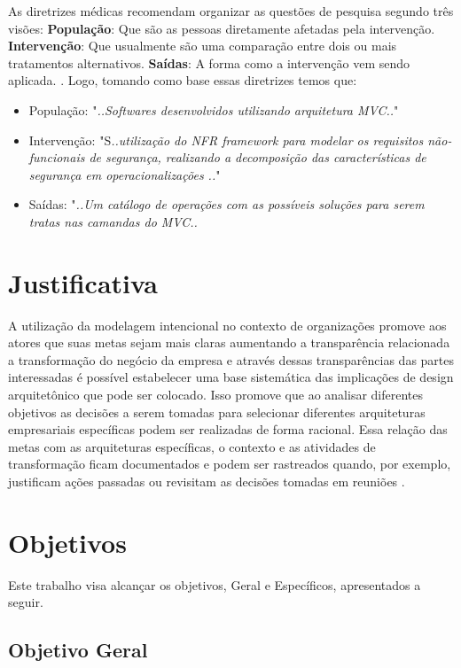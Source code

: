 As diretrizes médicas recomendam organizar as questões de pesquisa segundo três visões: \textbf{População}: Que são as pessoas diretamente afetadas pela intervenção. \textbf{Intervenção}: Que usualmente são uma comparação entre dois ou mais tratamentos alternativos. \textbf{Saídas}: A forma como a intervenção vem sendo aplicada. \cite{keele2007guidelines}. Logo, tomando como base essas diretrizes temos que: 

\begin{itemize}
	\item População: "\textit{..Softwares desenvolvidos utilizando arquitetura MVC..}"
	\item Intervenção: "S\textit{..utilização do NFR framework para modelar os requisitos não-funcionais de segurança, realizando a decomposição das características de segurança em operacionalizações  ..}"
	\item Saídas: "\textit{..Um catálogo de operações com as possíveis soluções para serem tratas nas camandas do MVC..}
\end{itemize}
\section{Justificativa}

A utilização da modelagem intencional no contexto de organizações promove aos atores que suas metas sejam mais claras aumentando a transparência relacionada a transformação do negócio da empresa e através dessas transparências das partes interessadas é possível estabelecer uma base sistemática das implicações de design arquitetônico que pode ser colocado. Isso promove que ao analisar diferentes objetivos as decisões a serem tomadas para selecionar diferentes arquiteturas empresariais específicas podem ser realizadas de forma racional. Essa relação das metas com as arquiteturas específicas, o contexto e as atividades de transformação ficam documentados  e podem ser rastreados quando, por exemplo, justificam ações passadas ou revisitam as decisões tomadas em reuniões \cite{yu2006exploring}.

\section{Objetivos}

Este trabalho visa alcançar os objetivos, Geral e Específicos, apresentados a seguir.  

\subsection{Objetivo Geral}

